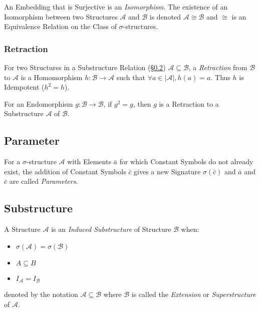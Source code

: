 An Embedding that is Surjective is an \emph{Isomorphism}. The
existence of an Isomorphism between two Structures $\mathcal{A}$ and
$\mathcal{B}$ is denoted $\mathcal{A} \cong \mathcal{B}$ and $\cong$
is an Equivalence Relation on the Class of $\sigma$-structures.



\subsubsection{Retraction}\label{sec:retraction}

For two Structures in a Substructure Relation
(\S\ref{sec:substructure}) $\mathcal{A} \subseteq \mathcal{B}$, a
\emph{Retraction} from $\mathcal{B}$ to $\mathcal{A}$ is a
Homomorphism $h : \mathcal{B} \rightarrow \mathcal{A}$ such that
$\forall a \in |\mathcal{A}|, h(a) = a$. Thus $h$ is Idempotent ($h^2
= h$).

For an Endomorphism $g : \mathcal{B} \rightarrow \mathcal{B}$, if $g^2
= g$, then $g$ is a Retraction to a Substructure $\mathcal{A}$ of
$\mathcal{B}$.



\subsection{Parameter}\label{sec:parameter}

For a $\sigma$-structure $\mathcal{A}$ with Elements $\bar{a}$ for
which Constant Symbols do not already exist, the addition of Constant
Symbols $\bar{c}$ gives a new Signature $\sigma(\bar{c})$ and
$\bar{a}$ and $\bar{c}$ are called \emph{Parameters}.



\subsection{Substructure}\label{sec:substructure}

A Structure $\mathcal{A}$ is an \emph{Induced Substructure} of
Structure $\mathcal{B}$ when:
\begin{itemize}
  \item $\sigma(\mathcal{A}) = \sigma(\mathcal{B})$
  \item $A \subseteq B$
  \item $I_{\mathcal{A}}=I_{\mathcal{B}}$
\end{itemize}
denoted by the notation $\mathcal{A} \subseteq \mathcal{B}$ where
$\mathcal{B}$ is called the \emph{Extension} or \emph{Superstructure}
of $\mathcal{A}$.

